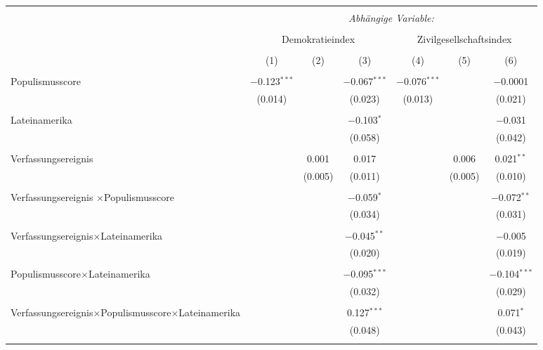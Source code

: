 \documentclass{standalone}
\begin{document}
\begin{table}[!htbp] \centering 
  \caption{} 
  \label{} 
\begin{tabular}{@{\extracolsep{5pt}}lcccccc} 
\\[-1.8ex]\hline 
\hline \\[-1.8ex] 
 & \multicolumn{6}{c}{\textit{Abhängige Variable:}} \\ 
\cline{2-7} 
\\[-1.8ex] & \multicolumn{3}{c}{Demokratieindex} & \multicolumn{3}{c}{Zivilgesellschaftsindex} \\ 
\\[-1.8ex] & (1) & (2) & (3) & (4) & (5) & (6)\\ 
\hline \\[-1.8ex] 
 Populismusscore & $-$0.123$^{***}$ &  & $-$0.067$^{***}$ & $-$0.076$^{***}$ &  & $-$0.0001 \\ 
  & (0.014) &  & (0.023) & (0.013) &  & (0.021) \\ 
  & & & & & & \\ 
 Lateinamerika &  &  & $-$0.103$^{*}$ &  &  & $-$0.031 \\ 
  &  &  & (0.058) &  &  & (0.042) \\ 
  & & & & & & \\ 
Verfassungsereignis &  & 0.001 & 0.017 &  & 0.006 & 0.021$^{**}$ \\ 
  &  & (0.005) & (0.011) &  & (0.005) & (0.010) \\ 
  & & & & & & \\ 
Verfassungsereignis $\times$Populismusscore &  &  & $-$0.059$^{*}$ &  &  & $-$0.072$^{**}$ \\ 
  &  &  & (0.034) &  &  & (0.031) \\ 
  & & & & & & \\ 
  Verfassungsereignis$\times$Lateinamerika &  &  & $-$0.045$^{**}$ &  &  & $-$0.005 \\ 
  &  &  & (0.020) &  &  & (0.019) \\ 
  & & & & & & \\ 
  Populismusscore$\times$Lateinamerika &  &  & $-$0.095$^{***}$ &  &  & $-$0.104$^{***}$ \\ 
  &  &  & (0.032) &  &  & (0.029) \\ 
  & & & & & & \\ 
  Verfassungsereignis$\times$Populismusscore$\times$Lateinamerika &  &  & 0.127$^{***}$ &  &  & 0.071$^{*}$ \\ 
  &  &  & (0.048) &  &  & (0.043) \\ 
  & & & & & & \\ 

\end{tabular}
\end{table}
\end{document}
